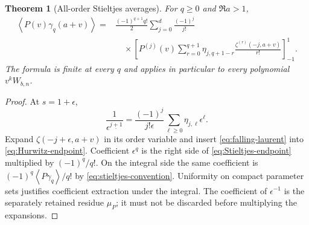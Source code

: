 \documentclass[11pt]{article}
\numberwithin{equation}{section}
\newtheorem{theorem}{Theorem}[section]
\theoremstyle{definition}\newtheorem{definition}[theorem]{Definition}
\theoremstyle{remark}\newtheorem{remark}[theorem]{Remark}
\newcommand{\avg}[1]{\left\langle #1\right\rangle}
\newcommand{\fall}[2]{#1^{\underline{#2}}}
\newcommand{\eval}[1]{\left[#1\right]_{-1}^{1}}
\begin{document}
\begin{theorem}[All-order Stieltjes averages]\label{thm:Stieltjes}
For $q\ge0$ and $\Re a>1$,
\begin{equation}\label{eq:Stieltjes-endpoint}
\begin{split}
 \avg{P(v)\gamma_q(a+v)}
 ={}&\frac{(-1)^{q+1}q!}{2}
 \sum_{j=0}^d\frac{(-1)^j}{j!}\\[-2pt]
 &\quad\times\eval{P^{(j)}(v)
 \sum_{r=0}^{q+1}\eta_{j,q+1-r}
       \frac{\zeta^{(r)}(-j,a+v)}{r!}}.
\end{split}
\end{equation}
The formula is finite at every $q$ and applies in particular to every
polynomial $v^kW_{b,n}$.
\end{theorem}
\begin{proof}
At $s=1+\epsilon$,
\begin{equation}\label{eq:falling-laurent}
 \frac1{\fall{\epsilon}{j+1}}
 =\frac{(-1)^j}{j!\epsilon}
       \sum_{\ell\ge0}\eta_{j,\ell}\epsilon^\ell.
\end{equation}
Expand $\zeta(-j+\epsilon,a+v)$ in its order variable and insert
\eqref{eq:falling-laurent} into \eqref{eq:Hurwitz-endpoint}. Coefficient
$\epsilon^q$ is the right side of \eqref{eq:Stieltjes-endpoint}
multiplied by $(-1)^q/q!$. On the integral side the same coefficient is
$(-1)^q\avg{P\gamma_q}/q!$ by
\eqref{eq:stieltjes-convention}. Uniformity on compact parameter sets
justifies coefficient extraction under the integral. The coefficient of
$\epsilon^{-1}$ is the separately retained residue $\mu_P$; it must not
be discarded before multiplying the expansions.
\end{proof}
\end{document}
